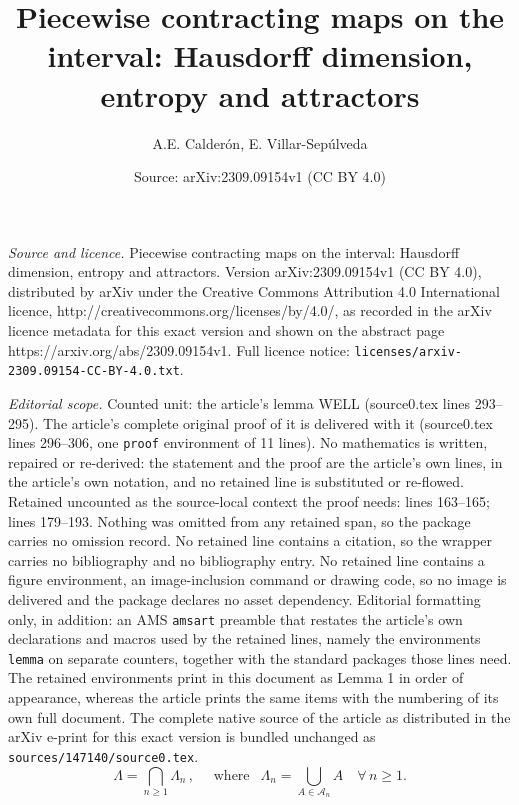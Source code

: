 \documentclass[10pt,a4paper]{amsart}
\title{Piecewise contracting maps on the interval: Hausdorff dimension, entropy and attractors}
\author{A.E. Calder\'on, E. Villar-Sep\'ulveda}
\date{Source: arXiv:2309.09154v1 (CC BY 4.0)}
\begin{document}
\maketitle

\noindent\emph{Source and licence.} Piecewise contracting maps on the interval: Hausdorff dimension, entropy and attractors. Version arXiv:2309.09154v1 (CC BY 4.0), distributed by arXiv under the Creative Commons Attribution 4.0 International licence, http://creativecommons.org/licenses/by/4.0/, as recorded in the arXiv licence metadata for this exact version and shown on the abstract page https://arxiv.org/abs/2309.09154v1. Full licence notice: \texttt{licenses/arxiv-2309.09154-CC-BY-4.0.txt}.\par\smallskip

\noindent\textit{Editorial scope.} Counted unit: the article's lemma WELL (source0.tex lines 293--295). The article's complete original proof of it is delivered with it (source0.tex lines 296--306, one \texttt{proof} environment of 11 lines). No mathematics is written, repaired or re-derived: the statement and the proof are the article's own lines, in the article's own notation, and no retained line is substituted or re-flowed.  Retained uncounted as the source-local context the proof needs: lines 163--165; lines 179--193.  Nothing was omitted from any retained span, so the package carries no omission record.  No retained line contains a citation, so the wrapper carries no bibliography and no bibliography entry.  No retained line contains a figure environment, an image-inclusion command or drawing code, so no image is delivered and the package declares no asset dependency.  Editorial formatting only, in addition: an AMS \texttt{amsart} preamble that restates the article's own declarations and macros used by the retained lines, namely the environments \texttt{lemma} on separate counters, together with the standard packages those lines need.  The retained environments print in this document as Lemma 1 in order of appearance, whereas the article prints the same items with the numbering of its own full document.  The complete native source of the article as distributed in the arXiv e-print for this exact version is bundled unchanged as \texttt{sources/147140/source0.tex}.
\begin{equation}
    \Lambda=\bigcap_{n\geq1}\Lambda_n\,,\quad \text{ where }\;\, \Lambda_n=\bigcup_{A\in\mathcal A_n}A\quad\forall\,n\geq1.\label{ATTRACTOR.ATOMS}
\end{equation}
\end{document}
